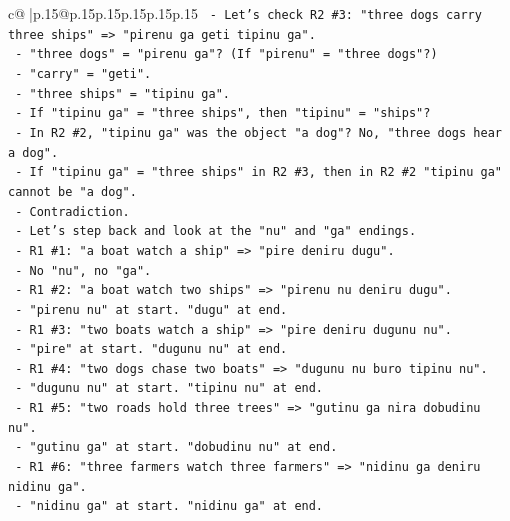 \documentclass{article}
\begin{document}
{\begin{supertabular}{c@{$\;$}|p{.15\linewidth}@{}p{.15\linewidth}p{.15\linewidth}p{.15\linewidth}p{.15\linewidth}p{.15\linewidth}}
{{{\texttt{                        {-} Let's check R2 \#3: "three dogs carry three ships" => "pirenu ga geti tipinu ga".} \\
\texttt{                          {-} "three dogs" = "pirenu ga"? (If "pirenu" = "three dogs"?)} \\
\texttt{                          {-} "carry" = "geti".} \\
\texttt{                          {-} "three ships" = "tipinu ga".} \\
\texttt{                          {-} If "tipinu ga" = "three ships", then "tipinu" = "ships"?} \\
\texttt{                          {-} In R2 \#2, "tipinu ga" was the object "a dog"? No, "three dogs hear a dog".} \\
\texttt{                          {-} If "tipinu ga" = "three ships" in R2 \#3, then in R2 \#2 "tipinu ga" cannot be "a dog".} \\
\texttt{                          {-} Contradiction.} \\
\texttt{                {-} Let's step back and look at the "nu" and "ga" endings.} \\
\texttt{                {-} R1 \#1: "a boat watch a ship" => "pire deniru dugu".} \\
\texttt{                  {-} No "nu", no "ga".} \\
\texttt{                {-} R1 \#2: "a boat watch two ships" => "pirenu nu deniru dugu".} \\
\texttt{                  {-} "pirenu nu" at start. "dugu" at end.} \\
\texttt{                {-} R1 \#3: "two boats watch a ship" => "pire deniru dugunu nu".} \\
\texttt{                  {-} "pire" at start. "dugunu nu" at end.} \\
\texttt{                {-} R1 \#4: "two dogs chase two boats" => "dugunu nu buro tipinu nu".} \\
\texttt{                  {-} "dugunu nu" at start. "tipinu nu" at end.} \\
\texttt{                {-} R1 \#5: "two roads hold three trees" => "gutinu ga nira dobudinu nu".} \\
\texttt{                  {-} "gutinu ga" at start. "dobudinu nu" at end.} \\
\texttt{                {-} R1 \#6: "three farmers watch three farmers" => "nidinu ga deniru nidinu ga".} \\
\texttt{                  {-} "nidinu ga" at start. "nidinu ga" at end.} \\
}}}
\end{supertabular}}
\end{document}
